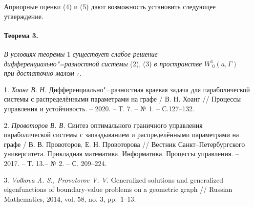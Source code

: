 Априорные оценки (4) и (5) дают возможность установить следующее утверждение.

\paragraph{Теорема 3.} \emph{В условиях теоремы} 1 \emph{существует слабое решение дифференциально"=разностной системы } (2), (3) \emph{в пространстве $W^1_{\,\,0}(a,\Gamma)$ при достаточно малом $\tau$}.

\litlist

1. \emph{Хоанг В. Н.}  Дифференциально"=разностная краевая задача для параболической системы с распределёнными параметрами на графе / В. Н. Хоанг // Процессы управления и устойчивость. -- 2020. -- Т. 7. -- № 1. -- С.127--132.

2. \emph{Провоторов В. В.} Синтез оптимального граничного управления параболической системы с запаздыванием и распределёнными параметрами на графе / В. В. Провоторов, Е. Н. Провоторова // Вестник Санкт--Петербургского университета. Прикладная математика. Информатика. Процессы управления. -- 2017. -- Т. 13.-- № 2. -- С. 209--224.


3. \emph{Volkova A. S., Provotorov V. V.}  Generalized solutions and generalized eigenfunctions of boundary-value problems on a geometric graph // Russian Mathematics, 2014, vol. 58, no. 3,  pp.~1--13.
